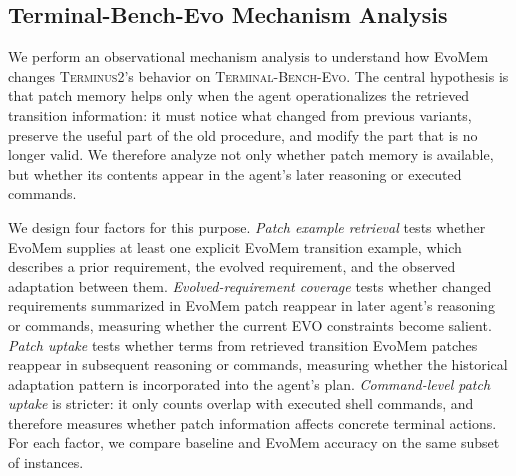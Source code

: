 \documentclass{article}
\begin{document}
\subsection{Terminal-Bench-Evo Mechanism Analysis}
\label{sec:terminal_pm_mechanism}

We perform an observational mechanism analysis to understand how EvoMem changes \textsc{Terminus2}'s behavior on \textsc{Terminal-Bench-Evo}. The central hypothesis is that patch memory helps only when the agent operationalizes the
  retrieved transition information: it must notice what changed from previous variants, preserve the useful part of the old procedure, and modify the part that is no longer valid. We therefore analyze not only
  whether patch memory is available, but whether its contents appear in the agent's later reasoning or executed commands.
  
We design four factors for this purpose. \emph{Patch example retrieval} tests whether EvoMem supplies at least one explicit EvoMem transition example, which describes a prior requirement, the evolved requirement, and the observed adaptation between them. \emph{Evolved-requirement coverage} tests whether changed requirements summarized in EvoMem patch reappear in later agent's reasoning or commands, measuring whether the current EVO constraints become salient. \emph{Patch uptake} tests whether terms from retrieved transition EvoMem patches reappear in subsequent reasoning or commands, measuring whether the historical adaptation pattern is incorporated into the agent's plan. \emph{Command-level patch uptake} is stricter: it only counts overlap with executed shell commands, and therefore measures whether patch information affects concrete terminal actions. 
For each factor, we compare baseline and EvoMem accuracy on the same subset of instances. 
\end{document}
